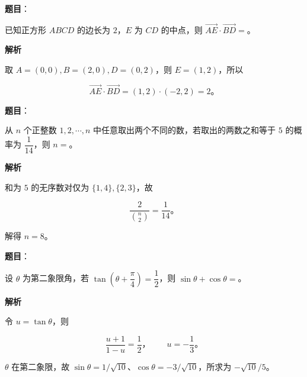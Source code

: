 \begin{answer}

\textbf{题目}：

已知正方形 $ABCD$ 的边长为 $2$，$E$ 为 $CD$ 的中点，则 $\overrightarrow{AE}\cdot\overrightarrow{BD}=$\gkblank{}。

\textbf{解析}

取 $A=(0,0),B=(2,0),D=(0,2)$，则 $E=(1,2)$，所以

\nopagebreak[4]
\[\overrightarrow{AE}\cdot\overrightarrow{BD}=(1,2)\cdot(-2,2)=2\text{。}\]


\end{answer}
\begin{answer}

\textbf{题目}：

从 $n$ 个正整数 $1,2,\cdots,n$ 中任意取出两个不同的数，若取出的两数之和等于 $5$ 的概率为 $\dfrac1{14}$，则 $n=$\gkblank{}。

\textbf{解析}

和为 $5$ 的无序数对仅为 $\{1,4\},\{2,3\}$，故

\nopagebreak[4]
\[\frac2{\binom n2}=\frac1{14}\text{。}\]

解得 $n=8$。


\end{answer}
\begin{answer}

\textbf{题目}：

设 $\theta$ 为第二象限角，若 $\tan\left(\theta+\dfrac\pi4\right)=\dfrac12$，则 $\sin\theta+\cos\theta=$\gkblank{}。

\textbf{解析}

令 $u=\tan\theta$，则

\nopagebreak[4]
\[\frac{u+1}{1-u}=\frac12\text{，}\qquad u=-\frac13\text{。}\]

$\theta$ 在第二象限，故 $\sin\theta=1/\sqrt{10}$、$\cos\theta=-3/\sqrt{10}$，所求为 $-\sqrt{10}/5$。


\end{answer}
